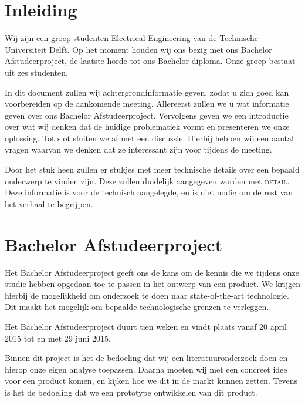 \documentclass[oneside, a4paper, openany]{memoir}
\begin{document}


\frontmatter
\setcounter{page}{5}
\begin{titlingpage}
  \pagestyle{empty}
  \titleGM
\end{titlingpage}

\tableofcontents

\clearpage
\mainmatter

\chapter{Inleiding}
Wij zijn een groep studenten Electrical Engineering van de Technische Universiteit Delft. Op het moment houden wij ons bezig met ons Bachelor Afstudeerproject, de laatste horde tot ons Bachelor-diploma. Onze groep bestaat uit zes studenten.

In dit document zullen wij achtergrondinformatie geven, zodat u zich goed kan voorbereiden op de aankomende meeting. Allereerst zullen  we u wat informatie geven over ons Bachelor Afstudeerproject. Vervolgens geven we een introductie over wat wij denken dat de huidige problematiek vormt en presenteren we onze oplossing. Tot slot sluiten we af met een discussie. Hierbij hebben wij een aantal vragen waarvan we denken dat ze interessant zijn voor tijdens de meeting.

Door het stuk heen zullen er stukjes met meer technische details over een bepaald onderwerp te vinden zijn. Deze zullen duidelijk aangegeven worden met \textsc{detail}. Deze informatie is voor de technisch aangelegde, en is niet nodig om de rest van het verhaal te begrijpen.

\chapter{Bachelor Afstudeerproject}
Het Bachelor Afstudeerproject geeft ons de kans om de kennis die we tijdens onze studie hebben opgedaan toe te passen in het ontwerp van een product. We krijgen hierbij de mogelijkheid om onderzoek te doen naar state-of-the-art technologie. Dit maakt het mogelijk om bepaalde technologische grenzen te verleggen.

Het Bachelor Afstudeerproject duurt tien weken en vindt plaats vanaf 20 april 2015 tot en met 29 juni 2015.

Binnen dit project is het de bedoeling dat wij een literatuuronderzoek doen en hierop onze eigen analyse toepassen. Daarna moeten wij met een concreet idee voor een product komen, en kijken hoe we dit in de markt kunnen zetten. Tevens is het de bedoeling dat we een prototype ontwikkelen van dit product.
\end{document}
